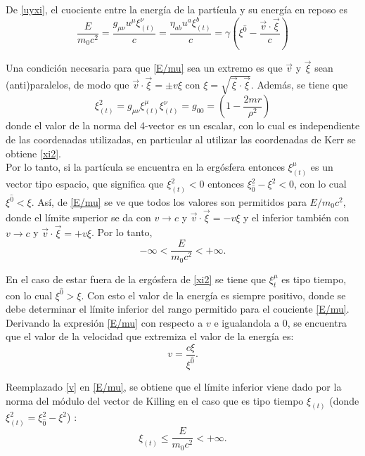 De \eqref{uyxi}, el cuociente entre la energ\'ia de la part\'icula y su energ\'ia en reposo es
\begin{equation}\label{E/mu}
\frac{E}{m_0c^2}=\frac{g_{\mu \nu}u^{\mu}\xi_{(t)}^{\nu}}{c}=\frac{\eta_{ab}u^a\xi^b_{(t)}}{c}=\gamma\left(\xi^{\hat{0}}-\frac{\vec{v} \cdot \vec{\xi}}{c} \right)
\end{equation}

Una condici\'on necesaria para que \eqref{E/mu} sea un extremo es que $\vec{v}$ y $\vec{\xi}$ sean (anti)paralelos, de modo que $\vec{v} \cdot \vec{\xi}=\pm v\xi$ con $\xi=\sqrt{\vec{\xi}\cdot \vec{\xi}}$. Adem\'as, se tiene que
\begin{equation}\label{xi2}
\xi_{(t)}^2=g_{\mu \nu} \xi_{(t)}^{\mu}\xi_{(t)}^{\nu}=g_{00}=\left( 1-\frac{2mr}{\rho^2}\right)
\end{equation}
donde el valor de la norma del 4-vector es un escalar, con lo cual es independiente de las coordenadas utilizadas, en particular al utilizar las coordenadas de Kerr se obtiene \eqref{xi2}.\\

Por lo tanto, si la part\'icula se encuentra en la erg\'osfera entonces $\xi_{(t)}^{\mu}$ es un vector tipo espacio, que significa que $\xi^2_{(t)}<0$ entonces $\xi_{\hat{0}}^2-\xi^{2}<0$, con lo cual $\xi^{\hat{0}} < \xi$. As\'i, de \eqref{E/mu} se ve que todos los valores son permitidos para $E/m_0c^2$, donde el l\'imite superior se da con $v \rightarrow c$ y $\vec{v} \cdot \vec{\xi}=-v\xi$ y el inferior tambi\'en con $v \rightarrow c$ y $\vec{v} \cdot \vec{\xi}=+v\xi$. Por lo tanto,
\begin{equation}\label{condicion1}
-\infty <\frac{E}{m_0c^2}<+\infty.
\end{equation}

En el caso de estar fuera de la erg\'osfera de \eqref{xi2} se tiene que $\xi_t^{\mu}$ es tipo tiempo, con lo cual $\xi^{\hat{0}} >\xi$. Con esto el valor de la energ\'ia es siempre positivo, donde se debe determinar el l\'imite inferior del rango permitido para el couciente \eqref{E/mu}.\\

Derivando la expresi\'on \eqref{E/mu} con respecto a $v$ e igualandola a 0, se encuentra que el valor de la velocidad que extremiza el valor de la energ\'ia es:
\begin{equation}\label{v}
v=\frac{c\xi}{\xi^{\hat{0}}}.
\end{equation}

Reemplazado \eqref{v} en \eqref{E/mu}, se obtiene que el l\'imite inferior viene dado por la norma del m\'odulo del vector de Killing en el caso que es tipo tiempo $\xi_{(t)}$ (donde $\xi^2_{(t)}=\xi_{\hat{0}}^2-\xi^2$) :
\begin{equation}\label{condicion2}
\xi_{(t)}\leq  \frac{E}{m_0c^2}<+\infty.
\end{equation}


